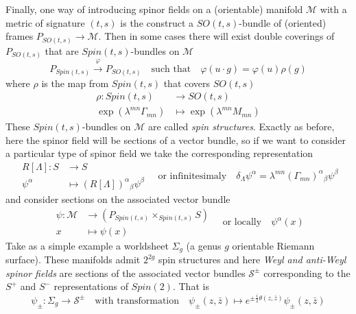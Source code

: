 \documentclass[a4paper,12pt]{article}
\numberwithin{equation}{section}
\numberwithin{thm}{section}
\numberwithin{exm}{section}
\newcommand{\M}{\mathcal M}
\newcommand{\zb}{{\bar z}}
\newcommand{\<}{{\langle}}
\renewcommand{\>}{{\rangle}}
\renewcommand{\a}{{\alpha}}
\renewcommand{\b}{{\beta}}
\renewcommand{\d}{{\delta}}
\newcommand{\G}{{\Gamma}}
\renewcommand{\l}{{\lambda}}
\renewcommand{\L}{{\Lambda}}
\renewcommand{\S}{{\Sigma}}
\begin{document}
Finally, one way of introducing spinor fields on a (orientable) manifold $\M$ with a metric of signature $(t,s)$ is the construct a $SO(t,s)$-bundle of (oriented) frames $P_{SO(t,s)}\rightarrow\M$. Then in some cases there will exist double coverings of $P_{SO(t,s)}$ that are $Spin(t,s)$-bundles on $\M$
	\begin{equation}
	P_{Spin(t,s)}\overset{\varphi}{\rightarrow} P_{SO(t,s)}\quad\text{such that}\quad \varphi(u\cdot g) = \varphi(u) \rho(g)
	\end{equation}
where $\rho$ is the map from $Spin(t,s)$ that covers $SO(t,s)$
	\begin{equation}
		\begin{aligned}
		\rho: Spin(t,s)&\rightarrow SO(t,s) \\
		\exp(\l^{mn}\G_{mn}) & \mapsto \exp(\l^{mn}M_{mn})
		\end{aligned}
	\end{equation}
These $Spin(t,s)$-bundles on $\M$ are called {\it spin structures}. Exactly as before, here the spinor field will be sections of a vector bundle, so if we want to consider a particular type of spinor field we take the corresponding representation
	\begin{equation}
		\begin{aligned}
		R[\L] : S & \rightarrow S \\
		\psi^\a & \mapsto (R[\L])^\a{}_\b \psi^\b
		\end{aligned}
	\quad\text{or infinitesimaly}\quad \d_\L \psi^\a = \l^{mn}(\G_{mn})^\a{}_\b \psi^\b
	\end{equation}
and consider sections on the associated vector bundle
	\begin{equation}
		\begin{aligned}
		\psi: \mathcal M & \rightarrow (P_{Spin(t,s)}\times_{Spin(t,s)} S) \\
		x & \mapsto \psi(x)
		\end{aligned}
	\quad\text{or locally}\quad\psi^\a(x)
	\end{equation}
Take as a simple example a worldsheet $\S_g$ (a genus $g$ orientable Riemann surface). These manifolds admit $2^{2g}$ spin structures and here {\it Weyl and anti-Weyl spinor fields} are sections of the associated vector bundles ${\mathcal S}^{\pm}$ corresponding to the $S^+$ and $S^-$ representations of $Spin(2)$. That is
	\begin{equation}
	\psi_{\pm}: \S_g\rightarrow {\mathcal S}^{\pm}\quad\text{with transformation}\quad\psi_{\pm}(z,\zb)\mapsto e^{\pm\frac{i}{2}\theta(z,\zb)}\psi_{\pm}(z,\zb)
	\end{equation}
\end{document}
